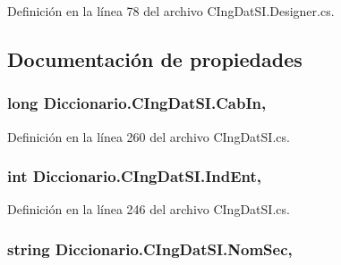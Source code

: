 Definición en la línea 78 del archivo C\-Ing\-Dat\-S\-I.\-Designer.\-cs.



\subsection{Documentación de propiedades}
\hypertarget{class_diccionario_1_1_c_ing_dat_s_i_ad60489d131f31899d8f25d8f65b067c0}{
\subsubsection[{Cab\-In}]{\setlength{\rightskip}{0pt plus 5cm}long Diccionario.\-C\-Ing\-Dat\-S\-I.\-Cab\-In\hspace{0.3cm}{\ttfamily [get]}, {\ttfamily [set]}}}\label{class_diccionario_1_1_c_ing_dat_s_i_ad60489d131f31899d8f25d8f65b067c0}


Definición en la línea 260 del archivo C\-Ing\-Dat\-S\-I.\-cs.

\hypertarget{class_diccionario_1_1_c_ing_dat_s_i_ab4dd2fc97c1b1c86c00f39c5f0b76723}{
\subsubsection[{Ind\-Ent}]{\setlength{\rightskip}{0pt plus 5cm}int Diccionario.\-C\-Ing\-Dat\-S\-I.\-Ind\-Ent\hspace{0.3cm}{\ttfamily [get]}, {\ttfamily [set]}}}\label{class_diccionario_1_1_c_ing_dat_s_i_ab4dd2fc97c1b1c86c00f39c5f0b76723}


Definición en la línea 246 del archivo C\-Ing\-Dat\-S\-I.\-cs.

\hypertarget{class_diccionario_1_1_c_ing_dat_s_i_a861359d0e072426ff8c115fd69c34436}{
\subsubsection[{Nom\-Sec}]{\setlength{\rightskip}{0pt plus 5cm}string Diccionario.\-C\-Ing\-Dat\-S\-I.\-Nom\-Sec\hspace{0.3cm}{\ttfamily [get]}, {\ttfamily [set]}}}\label{class_diccionario_1_1_c_ing_dat_s_i_a861359d0e072426ff8c115fd69c34436}


